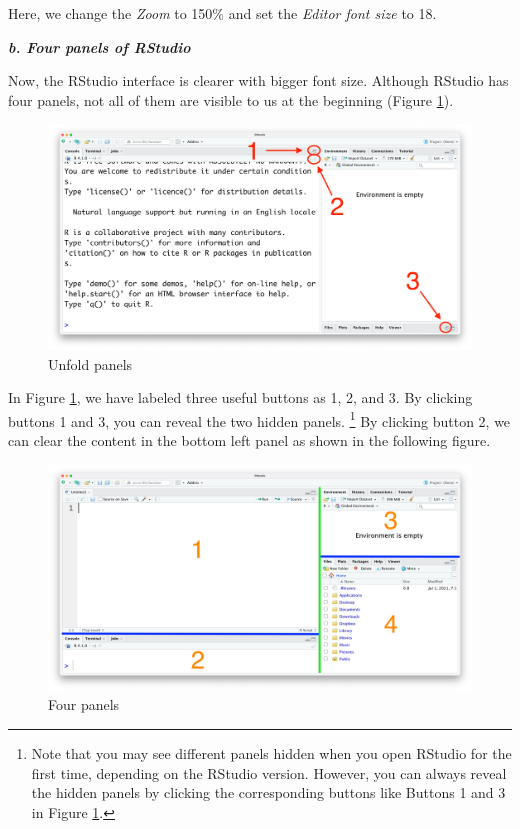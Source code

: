 \documentclass[
]{book}
\begin{document}
Here, we change the \emph{Zoom} to 150\% and set the \emph{Editor font size} to 18.

\textbf{\emph{b. Four panels of RStudio}}

Now, the RStudio interface is clearer with bigger font size. Although RStudio has four panels, not all of them are visible to us at the beginning (Figure \ref{fig:open}).

\begin{figure}

{\centering \includegraphics[width=1\linewidth]{pics/1open} 

}

\caption{Unfold panels}\label{fig:open}
\end{figure}

In Figure \ref{fig:open}, we have labeled three useful buttons as 1, 2, and 3. By clicking buttons 1 and 3, you can reveal the two hidden panels. \footnote{Note that you may see different panels hidden when you open RStudio for the first time, depending on the RStudio version. However, you can always reveal the hidden panels by clicking the corresponding buttons like Buttons 1 and 3 in Figure \ref{fig:open}.}
By clicking button 2, we can clear the content in the bottom left panel as shown in the following figure.

\begin{figure}

{\centering \includegraphics[width=1\linewidth]{pics/1four} 

}

\caption{Four panels}\label{fig:four}
\end{figure}
\end{document}
